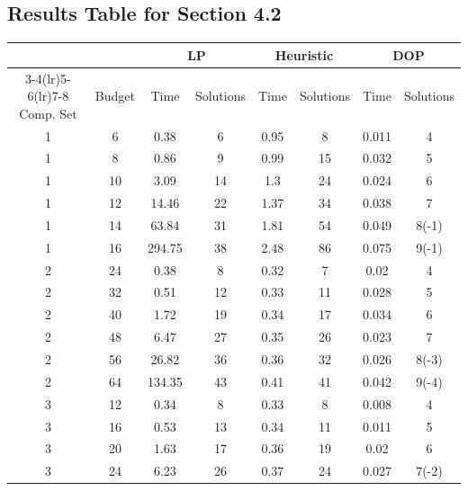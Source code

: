 \documentclass[11pt,authoryear,a4paper]{article}
\theoremstyle{definition}
\begin{document}
\subsection{Results Table for Section 4.2}
\begin{table}[tbp]
    \centering
    \begin{tabular}{cccccccc}\toprule
    & & \multicolumn{2}{c}{LP}& \multicolumn{2}{c}{Heuristic} & \multicolumn{2}{c}{DOP}\\ \cmidrule(lr){3-4}\cmidrule(lr){5-6}\cmidrule(lr){7-8}
    Comp. Set & Budget & Time    & Solutions & Time & Solutions & Time  & Solutions \\
1         & 6      & 0.38    & 6         & 0.95 & 8         & 0.011 & 4         \\
1         & 8      & 0.86    & 9         & 0.99 & 15        & 0.032 & 5         \\
1         & 10     & 3.09    & 14        & 1.3  & 24        & 0.024 & 6         \\
1         & 12     & 14.46   & 22        & 1.37 & 34        & 0.038 & 7         \\
1         & 14     & 63.84   & 31        & 1.81 & 54        & 0.049 & 8(-1)         \\
1         & 16     & 294.75  & 38        & 2.48 & 86        & 0.075 & 9(-1)         \\
2         & 24     & 0.38    & 8         & 0.32 & 7         & 0.02  & 4         \\
2         & 32     & 0.51    & 12        & 0.33 & 11        & 0.028 & 5         \\
2         & 40     & 1.72    & 19        & 0.34 & 17        & 0.034 & 6         \\
2         & 48     & 6.47    & 27        & 0.35 & 26        & 0.023 & 7         \\
2         & 56     & 26.82   & 36        & 0.36 & 32        & 0.026 & 8(-3)         \\
2         & 64     & 134.35  & 43        & 0.41 & 41        & 0.042 & 9(-4)         \\
3         & 12     & 0.34    & 8         & 0.33 & 8         & 0.008 & 4         \\
3         & 16     & 0.53    & 13        & 0.34 & 11        & 0.011 & 5         \\
3         & 20     & 1.63    & 17        & 0.36 & 19        & 0.02  & 6         \\
3         & 24     & 6.23    & 26        & 0.37 & 24        & 0.027 & 7(-2)         \\

\end{tabular}
\end{table}
\end{document}
